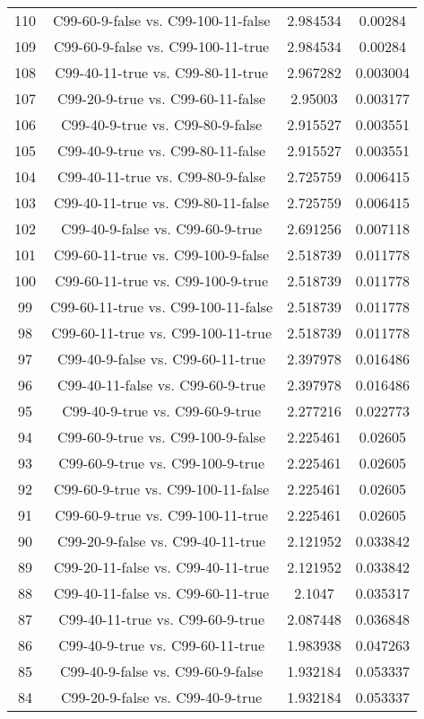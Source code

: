 \documentclass[a4paper,10pt]{article}
\begin{document}
\begin{landscape}
\begin{table}[!htp]
\begin{tabular}{cccc}
110&C99-60-9-false vs. C99-100-11-false&2.984534&0.00284\\
109&C99-60-9-false vs. C99-100-11-true&2.984534&0.00284\\
108&C99-40-11-true vs. C99-80-11-true&2.967282&0.003004\\
107&C99-20-9-true vs. C99-60-11-false&2.95003&0.003177\\
106&C99-40-9-true vs. C99-80-9-false&2.915527&0.003551\\
105&C99-40-9-true vs. C99-80-11-false&2.915527&0.003551\\
104&C99-40-11-true vs. C99-80-9-false&2.725759&0.006415\\
103&C99-40-11-true vs. C99-80-11-false&2.725759&0.006415\\
102&C99-40-9-false vs. C99-60-9-true&2.691256&0.007118\\
101&C99-60-11-true vs. C99-100-9-false&2.518739&0.011778\\
100&C99-60-11-true vs. C99-100-9-true&2.518739&0.011778\\
99&C99-60-11-true vs. C99-100-11-false&2.518739&0.011778\\
98&C99-60-11-true vs. C99-100-11-true&2.518739&0.011778\\
97&C99-40-9-false vs. C99-60-11-true&2.397978&0.016486\\
96&C99-40-11-false vs. C99-60-9-true&2.397978&0.016486\\
95&C99-40-9-true vs. C99-60-9-true&2.277216&0.022773\\
94&C99-60-9-true vs. C99-100-9-false&2.225461&0.02605\\
93&C99-60-9-true vs. C99-100-9-true&2.225461&0.02605\\
92&C99-60-9-true vs. C99-100-11-false&2.225461&0.02605\\
91&C99-60-9-true vs. C99-100-11-true&2.225461&0.02605\\
90&C99-20-9-false vs. C99-40-11-true&2.121952&0.033842\\
89&C99-20-11-false vs. C99-40-11-true&2.121952&0.033842\\
88&C99-40-11-false vs. C99-60-11-true&2.1047&0.035317\\
87&C99-40-11-true vs. C99-60-9-true&2.087448&0.036848\\
86&C99-40-9-true vs. C99-60-11-true&1.983938&0.047263\\
85&C99-40-9-false vs. C99-60-9-false&1.932184&0.053337\\
84&C99-20-9-false vs. C99-40-9-true&1.932184&0.053337\\

\end{tabular}
\end{table}
\end{landscape}
\end{document}
